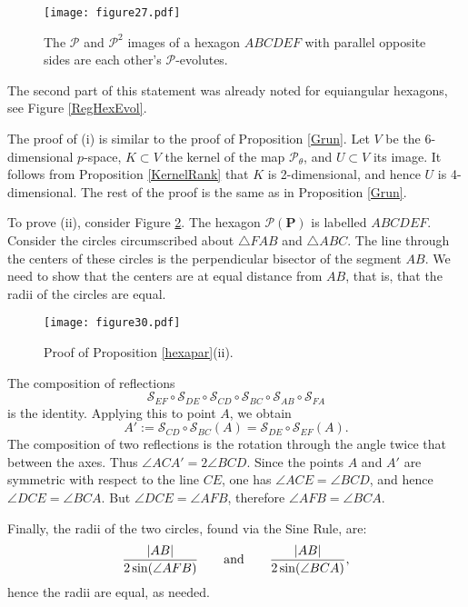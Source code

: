 \documentclass[12pt]{article}
\makeatletter
\renewenvironment{proof}[1][\proofname] 
{\par\pushQED{\qed}\normalfont\topsep6\p@\@plus6\p@\relax\trivlist\item[\hskip\labelsep\bfseries#1\@addpunct{.}]\ignorespaces}{\popQED\endtrivlist\@endpefalse}
\newcommand{\Pev}{\mathcal{P}}
\renewcommand{\P}{\mathbf{P}}
\makeatother
\begin{document}
\begin{figure}[hbtp]
\centering
\texttt{[image: figure27.pdf]} 
\caption{The $\Pev$ and $\Pev^2$ images of a hexagon $ABCDEF$ with parallel opposite sides are each other's $\Pev$-evolutes.}
\label{selfdual}
\end{figure}

The second part of this statement was already noted for equiangular 
hexagons, see Figure \ref{RegHexEvol}.

\begin{proof} The proof of (i) is similar to the proof of Proposition \ref{Grun}. Let $V$ be the 6-dimensional $p$-space, $K\subset V$ the kernel of the map $\Pev_{\theta}$, and $U\subset V$ its image. It follows from Proposition \ref{KernelRank} that  $K$ is 2-dimensional, and hence $U$ is 4-dimensional. The rest of the proof is the same as in Proposition \ref{Grun}.
	
To prove (ii), consider Figure \ref{hexaproof}. The hexagon $\Pev(\P)$ is labelled $ABCDEF$. Consider the circles circumscribed about $\triangle FAB$ and $\triangle ABC$. The line through the centers of these circles is the perpendicular bisector of the segment $AB$. We need to show that the centers are at equal distance from $AB$, that is, that the radii of the circles are equal.
	
\begin{figure}[hbtp]
\centering
\texttt{[image: figure30.pdf]} 
\caption{Proof of Proposition \ref{hexapar}(ii).}
\label{hexaproof}
\end{figure}

The composition of reflections 
$$\mathcal{S}_{EF} \circ \mathcal{S}_{DE} \circ \mathcal{S}_{CD} \circ \mathcal{S}_{BC} \circ \mathcal{S}_{AB} \circ \mathcal{S}_{FA}$$
is the identity. Applying this to point $A$, we obtain
$$A':=\mathcal{S}_{CD} \circ \mathcal{S}_{BC} (A) = \mathcal{S}_{DE}  \circ \mathcal{S}_{EF} (A).$$ 
The composition of two reflections is the rotation through the angle twice that between the axes. Thus $\angle ACA' = 2 \angle BCD$. Since the points $A$ and $A'$ are symmetric with respect to the line $CE$, one has $\angle ACE = \angle BCD$, and hence $\angle DCE = \angle BCA$. But $\angle DCE = \angle AFB$, therefore $\angle AFB = \angle BCA$.
	
Finally, the radii of the two circles, found via the Sine Rule, are:
$$\frac{|AB|}{2 \sin (\angle AFB)}\qquad{\rm and}\qquad\frac{|AB|}{2 \sin (\angle BCA)},$$
hence the radii are equal, as needed.
\end{proof}
\end{document}
